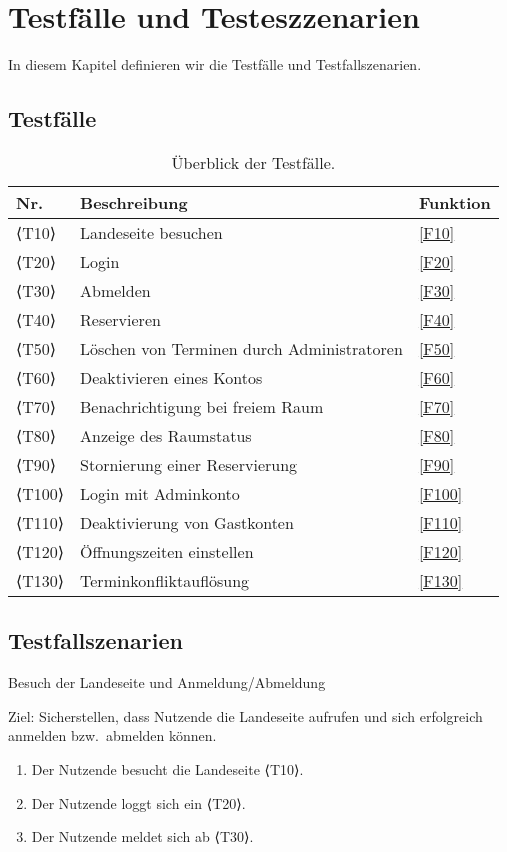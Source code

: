 \chapter{Testfälle und Testeszzenarien}
\label{chap:test}
In diesem Kapitel definieren wir die Testfälle und Testfallszenarien.

\section{Testfälle}

\begin{table}[htbp]
  \centering
  \begin{tabularx}{\textwidth}{ l|X|l }
      \textbf{Nr.} & \textbf{Beschreibung} & \textbf{Funktion} \\ \hline\hline
      ⟨T10⟩ & Landeseite besuchen &\ref{F10}\\
      ⟨T20⟩ & Login &\ref{F20} \\
      ⟨T30⟩ & Abmelden &\ref{F30} \\
      ⟨T40⟩ & Reservieren &\ref{F40} \\
      ⟨T50⟩ & Löschen von Terminen durch Administratoren &\ref{F50} \\
      ⟨T60⟩ & Deaktivieren eines Kontos &\ref{F60} \\
      ⟨T70⟩ & Benachrichtigung bei freiem Raum &\ref{F70} \\
      ⟨T80⟩ & Anzeige des Raumstatus &\ref{F80} \\
      ⟨T90⟩ & Stornierung einer Reservierung &\ref{F90} \\
      ⟨T100⟩ & Login mit Adminkonto &\ref{F100} \\
      ⟨T110⟩ & Deaktivierung von Gastkonten &\ref{F110} \\
      ⟨T120⟩ & Öffnungszeiten einstellen &\ref{F120} \\
      ⟨T130⟩ & Terminkonfliktauflösung &\ref{F130} \\
  \end{tabularx}
  \caption{Überblick der Testfälle.}
  \label{tab:test_table}
\end{table}

\pagebreak

\section{Testfallszenarien}\label{sec:testfallszenarien}
\begin{scenario}{10}{Besuch der Landeseite und Anmeldung/Abmeldung}
  \item[Ziel:] Sicherstellen, dass Nutzende die Landeseite aufrufen und sich erfolgreich anmelden bzw.\ abmelden können.
  \begin{enumerate}
    \item Der Nutzende besucht die Landeseite ⟨T10⟩.
    \item Der Nutzende loggt sich ein ⟨T20⟩.
    \item Der Nutzende meldet sich ab ⟨T30⟩.
  \end{enumerate}
\end{scenario}

